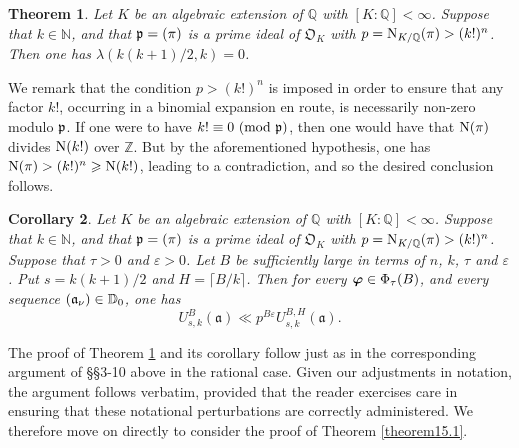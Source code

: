 \documentclass[12pt,reqno]{amsart}
\newtheorem{theorem}{Theorem}[section]
\newtheorem{corollary}[theorem]{Corollary}
\theoremstyle{definition}
\theoremstyle{remark}
\numberwithin{equation}{section}
\newcommand{\mmod}[1]{\,\,(\text{\rm mod}\,\,#1)}
\def\dbN{{\mathbb N}} \def\dbO{{\mathbb O}} \def\dbP{{\mathbb P}}
\def\dbZ{{\mathbb Z}}\def\dbQ{{\mathbb Q}}
\def\gra{{\mathfrak a}}\def\grA{{\mathfrak A}}\def\bfgra{{\boldsymbol \gra}}
\def\grO{{\mathfrak O}}
\def\lam{{\lambda}} \def\Lam{{\Lambda}} \def\Lamtil{{\widetilde \Lambda}}
\def\eps{\varepsilon}
\begin{document}
\begin{theorem}\label{theorem15.4} Let $K$ be an algebraic extension of $\dbQ$ with 
$[K:\dbQ]<\infty$. Suppose that $k\in \dbN$, and that $\grp=(\pi)$ is a prime ideal of 
$\grO_K$ with $p={\rm N}_{K/\dbQ}(\pi)>(k!)^n$. Then one has $\lam(k(k+1)/2,k)=0$.
\end{theorem}

We remark that the condition $p>(k!)^n$ is imposed in order to ensure that any factor 
$k!$, occurring in a binomial expansion en route, is necessarily non-zero modulo $\grp$. 
If one were to have $k!\equiv 0\mmod{\grp}$, then one would have that ${\rm N}(\pi)$ 
divides ${\rm N}(k!)$ over $\dbZ$. But by the aforementioned hypothesis, one has 
${\rm N}(\pi)>(k!)^n\ge {\rm N}(k!)$, leading to a contradiction, and so the desired 
conclusion follows.

\begin{corollary}\label{corollary15.5} Let $K$ be an algebraic extension of $\dbQ$ with 
$[K:\dbQ]<\infty$. Suppose that $k\in \dbN$, and that $\grp=(\pi)$ is a prime ideal of 
$\grO_K$ with $p={\rm N}_{K/\dbQ}(\pi)>(k!)^n$. Suppose that $\tau>0$ and $\eps>0$. 
Let $B$ be sufficiently large in terms of $n$, $k$, $\tau$ and $\eps$. Put $s=k(k+1)/2$ and 
$H=\lceil B/k\rceil$. Then for every $\bfvarphi\in \Phi_\tau(B)$, and every sequence 
$(\gra_\nu)\in \dbD_0$, one has
$$U_{s,k}^B(\bfgra)\ll p^{B\eps}U_{s,k}^{B,H}(\bfgra).$$
\end{corollary}

The proof of Theorem \ref{theorem15.4} and its corollary follow just as in the 
corresponding argument of \S\S3-10 above in the rational case. Given our adjustments in 
notation, the argument follows verbatim, provided that the reader exercises care in ensuring 
that these notational perturbations are correctly administered. We therefore move on 
directly to consider the proof of Theorem \ref{theorem15.1}.
\end{document}
